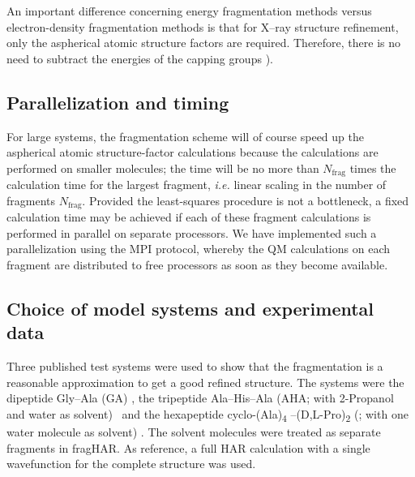 \documentclass[preprint,dvipsnames]{iucr}              %
\newcommand{\s}[1]{{\textrm{#1}}}
\begin{document}
An important difference concerning energy fragmentation methods 
versus electron-density fragmentation methods is that for X--ray 
structure refinement, only the aspherical atomic structure
factors are required. Therefore, there is no need to subtract the energies
of the capping groups \cite{zhang2003molecular}). 



\subsection{Parallelization and timing}

For large systems, the fragmentation scheme will of course
speed up the aspherical atomic structure-factor calculations
because the %
calculations are performed on smaller
molecules; the time will be no more than $N_\s{frag}$ times the calculation
time for the largest fragment, {\em i.e.} linear scaling in the number
of fragments $N_\s{frag}$. Provided the least-squares
procedure is not a bottleneck, a fixed calculation time
may be achieved if each of these fragment calculations is
performed in parallel on separate processors. 
We have implemented such a parallelization using the MPI
protocol, whereby the QM calculations on each fragment are
distributed to free processors as soon as they become available.

\subsection{Choice of model systems and experimental data}

Three published test systems were used to show that the  
fragmentation is a reasonable approximation to get a good refined structure.
The systems were the dipeptide Gly--Ala (GA) \cite{capelli2014hirshfeld}, 
the tripeptide  Ala--His--Ala (AHA; with 2-Propanol and water as solvent)~\cite{grabowsky2009transferability} and 
the hexapeptide cyclo-(Ala)\textsubscript{4} --(D,L-Pro)\textsubscript{2} 
(; with one water molecule as solvent) \cite{dittrich2002reproducability}. 
The solvent molecules were treated as separate fragments in fragHAR.
As reference, a full HAR calculation with a single wavefunction for the complete structure was used.
\end{document}
